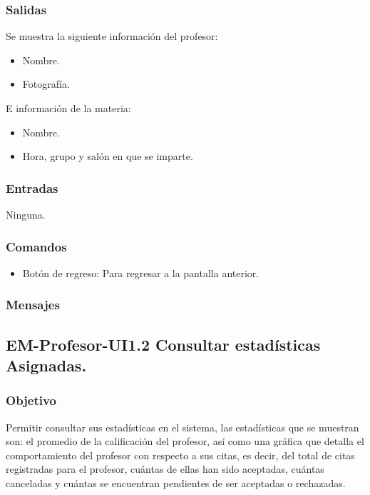 \pagebreak
{}

\subsubsection{Salidas}
	Se muestra la siguiente información del profesor:
	\begin{itemize}
		\item Nombre.
		\item Fotografía. 
	\end{itemize}
	E información de la materia:
	\begin{itemize}
		\item Nombre.
		\item Hora, grupo y salón en que se imparte. 
	\end{itemize}

\subsubsection{Entradas}
	\noindent
	Ninguna.

\subsubsection{Comandos}
\begin{itemize}
	\item Botón de regreso: Para regresar a la pantalla anterior.
\end{itemize}

\subsubsection{Mensajes}
	\noindent 


\subsection{EM-Profesor-UI1.2 Consultar estadísticas Asignadas.}

\subsubsection{Objetivo}
	\noindent
	Permitir consultar sus estadísticas en el sistema, las estadísticas que se muestran son: el promedio de la calificación del profesor, así como una gráfica que detalla el comportamiento del profesor con respecto a sus citas, es decir, del total de citas registradas para el profesor, cuántas de ellas han sido aceptadas, cuántas canceladas y cuántas se encuentran pendientes de ser aceptadas o rechazadas. 


